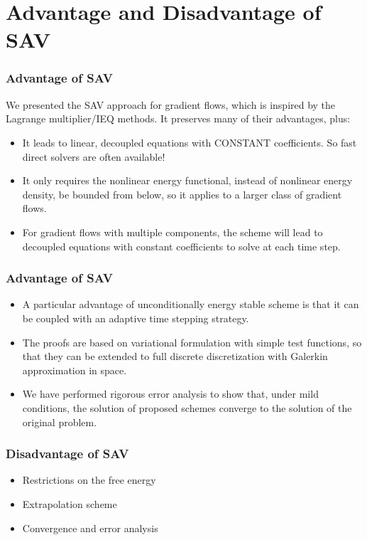 \documentclass{beamer}
\begin{document}
\section{Advantage and Disadvantage of SAV}
\begin{frame}
\frametitle{Advantage of SAV}
We presented the SAV approach for gradient flows, which is inspired by the Lagrange multiplier/IEQ methods. It preserves many of their advantages, plus:
\begin{itemize}
  \item It leads to linear, decoupled equations with CONSTANT coefficients. So fast direct solvers are often available!
  \item It only requires the nonlinear energy functional, instead of nonlinear energy density, be bounded from below, so it applies to a larger class of gradient flows.
  \item For gradient flows with multiple components, the scheme will lead to decoupled equations with constant coefficients to solve at each time step.
\end{itemize}
\end{frame}
\begin{frame}
\frametitle{Advantage of SAV}
\begin{itemize}
  \item A particular advantage of unconditionally energy stable scheme is that it can be coupled with an adaptive time stepping strategy.
  \item The proofs are based on variational formulation with simple test functions, so that they can be extended to full discrete discretization with Galerkin approximation in space.
  \item We have performed rigorous error analysis to show that, under mild conditions, the solution of proposed schemes converge to the solution of the original problem.\cite{doi:10.1137/17M1159968}
\end{itemize}
\end{frame}
    \begin{frame}
\frametitle{Disadvantage of SAV}
    \begin{itemize}
      \item Restrictions on the free energy
      \item Extrapolation scheme
      \item Convergence and error analysis
    \end{itemize}


    \end{frame}
\end{document}
